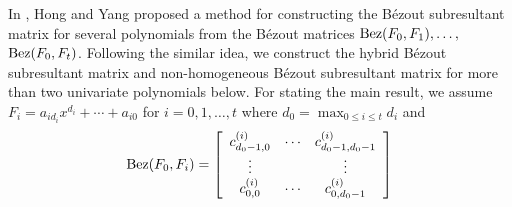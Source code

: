 \documentclass{article}
\begin{document}
In \cite{hong2021subresultant}, Hong and Yang proposed a method for constructing the B\'ezout subresultant matrix for several polynomials from the B\'ezout matrices  ${\rm Bez}(F_0,F_1),\ldots,$ ${\rm Bez}(F_0,F_t)$. Following the similar idea, we  construct the  hybrid B\'ezout subresultant matrix and non-homogeneous B\'ezout subresultant matrix for more than two univariate polynomials below.
For stating the main result, we assume
$F_i=a_{id_i}x^{d_i}+\cdots+a_{i0}$ for $i=0,1,\ldots,t$ where $d_0=\max_{0\le i\le t}d_i$ and
$${\rm Bez}(F_0,F_i)
 =
\left[
\begin{array}{*{20}{c}}
{c_{d_{0}-1,0}^{(i)}}& \cdots &{c_{d_{0}-1,{d_{0}} - 1}^{(i)}}\\
 \vdots &{}& \vdots \\
c_{0,0}^{(i)}& \cdots &c_{0,d_{0}-1}^{(i)}
\end{array} \right]$$
\end{document}
